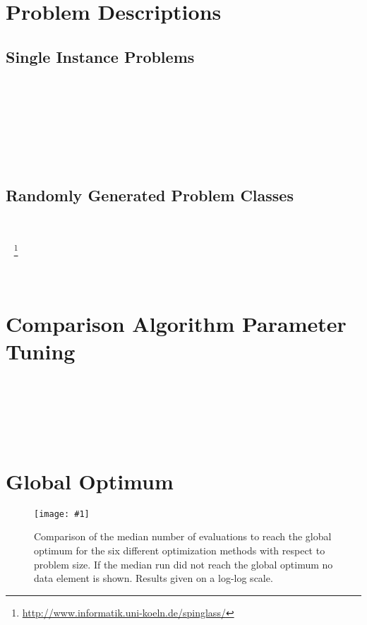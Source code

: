 \documentclass[twoside]{article}
\newcommand{\includegraphicsfit}[1]
{\texttt{[image: \#1]}}
\begin{document}
\section{Problem Descriptions}
\label{sec-problems}

\subsection{Single Instance Problems}
~\cite{goldberg:1991:gasize} %

~\cite{goldman:2012:ltga} %

~\cite{thierens:2013:ltgahiff} %

~\cite{goldman:2014:p3} %

\subsection{Randomly Generated Problem Classes}

~\cite{wright:2000:solvingnk}

~\cite{saul:1994:spinglass}
\footnote{\url{http://www.informatik.uni-koeln.de/spinglass/}}

~\cite{goldman:2014:p3} %

\section{Comparison Algorithm Parameter Tuning}
\label{sec-tuning}

~\cite{goldman:2012:ltga} %

~\cite{goldman:2014:p3}

~\cite{jovanovic:1997:ruleofthree}

\section{Global Optimum}
\label{sec-optimum}

\begin{figure}[t]
  \begin{center}
  \includegraphicsfit{evals-to-success}
  \end{center}
  \caption{Comparison of the median number of evaluations to reach the global optimum for
           the six different optimization methods with respect
           to problem size.  If the median run did not reach the global optimum no data element
           is shown.  Results given on a log-log scale.}
  \label{fig-evals-to-success}
\end{figure}
\end{document}
